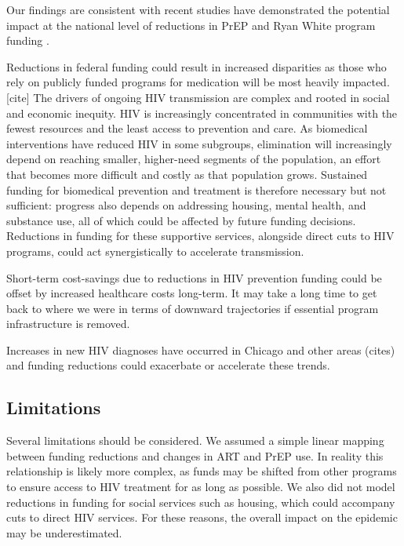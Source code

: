 \documentclass[preprint,12pt]{elsarticle}
\begin{document}
Our findings are consistent with recent studies have demonstrated the potential impact at the national level of reductions in PrEP \cite{sullivan_excess_2025} and Ryan White program funding \citep{forster_potential_2025}.

Reductions in federal funding could result in increased disparities as those who rely on publicly funded programs for medication will be most heavily impacted.[cite] The drivers of ongoing HIV transmission are complex and rooted in social and economic inequity. HIV is increasingly concentrated in communities with the fewest resources and the least access to prevention and care. As biomedical interventions have reduced HIV in some subgroups, elimination will increasingly depend on reaching smaller, higher-need segments of the population, an effort that becomes more difficult and costly as that population grows. Sustained funding for biomedical prevention and treatment is therefore necessary but not sufficient: progress also depends on addressing housing, mental health, and substance use, all of which could be affected by future funding decisions. Reductions in funding for these supportive services, alongside direct cuts to HIV programs, could act synergistically to accelerate transmission.

Short-term cost-savings due to reductions in HIV prevention funding could be offset by increased healthcare costs long-term. It may take a long time to get back to where we were in terms of downward trajectories if essential program infrastructure is removed. 

Increases in new HIV diagnoses have occurred in Chicago \citep{chicago_hiv_data_brief_2024} and other areas (cites) and funding reductions could exacerbate or accelerate these trends. 

\subsection{Limitations}
\label{sec:discussion-limitations}

Several limitations should be considered. We assumed a simple linear mapping between funding reductions and changes in ART and PrEP use. In reality this relationship is likely more complex, as funds may be shifted from other programs to ensure access to HIV treatment for as long as possible. We also did not model reductions in funding for social services such as housing, which could accompany cuts to direct HIV services. For these reasons, the overall impact on the epidemic may be underestimated.
\end{document}
